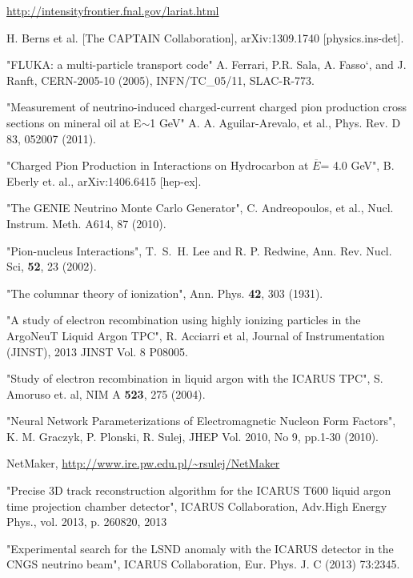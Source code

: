 \begin{thebibliography}{99}
 \url{http://intensityfrontier.fnal.gov/lariat.html}

 H. Berns et al. [The CAPTAIN Collaboration], arXiv:1309.1740 [physics.ins-det].

 "FLUKA: a multi-particle transport code" A. Ferrari, P.R. Sala, A. Fasso`, and J. Ranft, CERN-2005-10 (2005), INFN/TC\_05/11, SLAC-R-773.

  "Measurement of neutrino-induced charged-current charged pion production cross sections on mineral oil at E$\sim$1 GeV" A. A. Aguilar-Arevalo, et al., Phys. Rev. D 83, 052007 (2011).

 "Charged Pion Production in Interactions on Hydrocarbon 
at $\overline{E}$= 4.0 GeV", B. Eberly et. al., arXiv:1406.6415 [hep-ex].

 "The GENIE Neutrino Monte Carlo Generator", C. Andreopoulos, et al., Nucl. Instrum. Meth. A614, 87 (2010).

 "Pion-nucleus Interactions", T.~S.~H. Lee and R. P. Redwine, Ann. Rev. Nucl. Sci,  {\bf 52}, 23 (2002).

 "The columnar theory of ionization", Ann. Phys. {\bf 42}, 303 (1931).

 "A study of electron recombination using highly ionizing particles in the ArgoNeuT Liquid Argon TPC", 
R. Acciarri et al, Journal of Instrumentation 
(JINST), 2013 JINST Vol. 8 P08005.

 "Study of electron recombination in liquid argon with the ICARUS TPC", S. Amoruso et. al, NIM A {\bf 523}, 275 (2004). 

 "Neural Network Parameterizations of Electromagnetic Nucleon Form Factors", K. M. Graczyk, P. Plonski, R. Sulej, JHEP Vol. 2010, No 9, pp.1-30 (2010).

 NetMaker, \url{http://www.ire.pw.edu.pl/~rsulej/NetMaker}

"Precise 3D track reconstruction algorithm for the ICARUS T600 liquid argon time projection chamber detector", ICARUS Collaboration, 
Adv.High Energy Phys., vol. 2013, p. 260820, 2013

 "Experimental search for the LSND anomaly with the ICARUS
detector in the CNGS neutrino beam", ICARUS Collaboration, Eur. Phys. J. C (2013) 73:2345.


\end{thebibliography}
